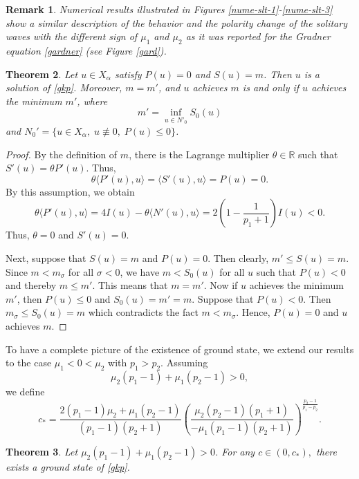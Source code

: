 \documentclass[10pt]{article}
\newcommand{\paar}[1]{\left( #1 \right)}
\numberwithin{equation}{section}
\newtheorem{theorem}{\quad Theorem}[section]
\newtheorem{remark}[theorem]{\quad Remark}
\newcommand{\mo}{\mu_1}  \newcommand{\po}{{p_1}}
\newcommand{\moo}{\mu_2}  \newcommand{\poo}{{p_2}}
\newcommand{\al}{\alpha}
\newcommand{\rr}{\mathbb{R}}
\begin{document}
	
	
	\begin{remark}
		Numerical results illustrated in Figures \ref{nume-slt-1}-\ref{nume-slt-3} show a similar description of the behavior and the polarity change of the solitary waves with the different sign of $\mu_1$ and $\mu_2$ as it was reported for the Gradner equation \eqref{gardner} (see   Figure \ref{gard}).  
	\end{remark}
	\begin{theorem}\label{exist-th}
		Let $u\in X_\al$ satisfy $P(u)=0$ and $S(u)=m$. Then $u$ is a solution of \eqref{gkp}. Moreover, $m=m'$, and $u$ achieves $m$ is and only if $u$ achieves the minimum $m'$, where
		\[
		m'=\inf_{u\in N'_0}S_0(u)
		\]
		and $N_0'=\{u\in X_\al,\;u\not\equiv0,\; P(u)\leq0\}$.
	\end{theorem}
	\begin{proof}
		By the definition of $m$, there is the Lagrange multiplier $\theta\in\rr$ such that $S'(u)=\theta P'(u)$. Thus,
		\[
		\theta\langle P'(u),u\rangle=\langle S'(u),u\rangle=P(u)=0.
		\]
		By this assumption, we obtain
		\[
		\theta\langle P'(u),u\rangle
		=4I(u)-	\theta\langle N'(u),u\rangle=2\left(1-\frac{1}{\po+1}\right)I(u)<0.
		\]
		Thus, $\theta=0$ and $S'(u)=0$.
		
		Next, suppose that $S(u)=m$ and $P(u)=0$. Then clearly, $m'\leq S(u)=m$. Since $m<m_{\sigma}$ for all $\sigma<0$, we have $m<S_0(u)$ for all $u$ such that $P(u)<0$ and thereby  $m\leq m'$. This means that $m=m'$. Now if $u$ achieves the minimum $m'$, then $P(u)\leq0$ and $S_0(u)=m'=m$. Suppose that $P(u)<0$. Then $m_\sigma\leq S_0(u)=m$ which contradicts the fact $m<m_\sigma$. Hence, $P(u)=0$ and $u$ achieves  $m$.
	\end{proof}
 
	
 


	To have a complete picture of the existence of ground state, we extend our results to the case   $\mu_1<0<\mu_2$ with $\po>\poo$. Assuming
\begin{equation}\label{exist-cond}
		\moo(\po-1)+\mo(\poo-1)>0,
\end{equation}
	we define
	\[
	c_\ast=\frac{2(\po-1)\mu_2+\mu_1(\poo-1)}{(\po-1)(\poo+1)}
	\paar{\frac{\moo(\poo-1)(\po+1)}{-\mo(\po-1)(\poo+1)}}^\frac{\poo-1}{\po-\poo}.
	\]
	
	
	\begin{theorem}\label{ex-theo-pq}
Let $\moo(\po-1)+\mo(\poo-1)>0$.		For any $c\in(0,c_\ast),$  there exists a ground state of \eqref{gkp}.
	\end{theorem}
	
\end{document}
